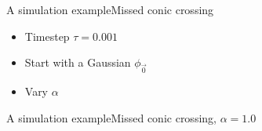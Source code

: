 \documentclass{beamer}
\begin{document}
\begin{frame}{A simulation example}{Missed conic crossing}
\begin{itemize}
\begin{align*}
\begin{pmatrix}
      \end{pmatrix}
      \quad
      \mat{Q} = \begin{pmatrix}
        1 & 0 \\ 0 & 1
      \end{pmatrix}
      \quad
      \mat{P} = \begin{pmatrix}
        i & 0 \\ 0 & i
      \end{pmatrix}
      \quad
      S = 0
    \end{align*}
  \item Timestep $\tau = 0.001$
  \item Start with a Gaussian $\phi_{\vec{0}}$
  \item Vary $\alpha$
  \end{itemize}
\end{frame}


\begin{frame}{A simulation example}{Missed conic crossing, $\alpha = 1.0$}
  \begin{figure}
    \centering
  \end{figure}
\end{frame}
\end{document}

